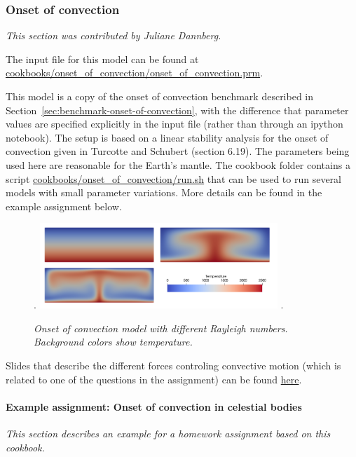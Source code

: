 \subsubsection{Onset of convection}
\label{sec:cookbooks-onset-of-convection}
\textit{This section was contributed by Juliane Dannberg.}

The input file for this model can be found at \url{cookbooks/onset_of_convection/onset_of_convection.prm}.

This model is a copy of the onset of convection benchmark described in Section~\ref{sec:benchmark-onset-of-convection}, 
with the difference that parameter values are specified explicitly in the input file (rather than through an ipython notebook). 
The setup is based on a linear stability analysis for the onset of convection given in Turcotte and Schubert \cite{TS14} (section 6.19).
The parameters being used here are reasonable for the Earth's mantle. The cookbook folder contains a script 
\url{cookbooks/onset_of_convection/run.sh} that can be used to run several models with small parameter variations.
More details can be found in the example assignment below. 

\begin{figure}[h]
\phantom.
\hfill
\includegraphics[width=0.8\textwidth]{cookbooks/onset_of_convection/doc/convection_models.png}
\hfill
\phantom.
\caption{\it Onset of convection model with different Rayleigh numbers. Background colors show temperature.}
\label{fig:convection-box-iterations}
\end{figure}

Slides that describe the different forces controling convective motion (which is related to one of the questions
in the assignment) can be found \href{https://www.dropbox.com/s/0wqtg05w7713hdz/06_geophysics_lecture_01_29.pdf?dl=0}{here}.

\paragraph{Example assignment: Onset of convection in celestial bodies}
\textit{This section describes an example for a homework assignment based on this cookbook.}

